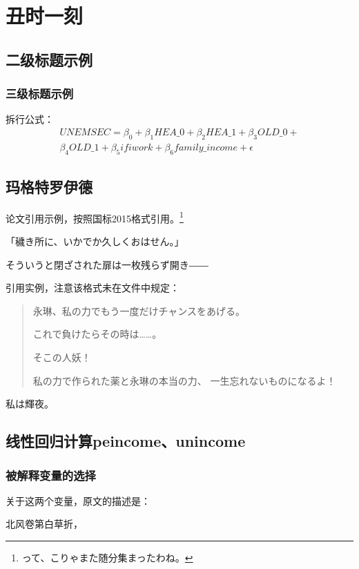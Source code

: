 \chapter{丑时一刻}
\section{二级标题示例}
\subsection{三级标题示例}
拆行公式：
\begin{equation}
    \begin{split}
        UNEMSEC = \beta_0 + \beta_1HEA\_0 + \beta_2HEA\_1 + \beta_3OLD\_0 +  \\
        \beta_4OLD\_1 + \beta_5ifiwork + \beta_6family\_income + \epsilon
    \end{split}
\end{equation}

\lipsum[1]

\section{玛格特罗伊德}
论文引用示例\cite{王宣承-1}，按照国标2015格式引用。\footnote{って、こりゃまた随分集まったわね。}

「穢き所に、いかでか久しくおはせん。」

そういうと閉ざされた扉は一枚残らず開き――

引用实例，注意该格式未在文件中规定：
\begin{quotation}

永琳、私の力でもう一度だけチャンスをあげる。

これで負けたらその時は……。

そこの人妖！

私の力で作られた薬と永琳の本当の力、
一生忘れないものになるよ！
\end{quotation}

私は輝夜。

\section{线性回归计算peincome、unincome}
\subsection{被解释变量的选择}
关于这两个变量，原文的描述是：
\lipsum[2]

北风卷第白草折，


